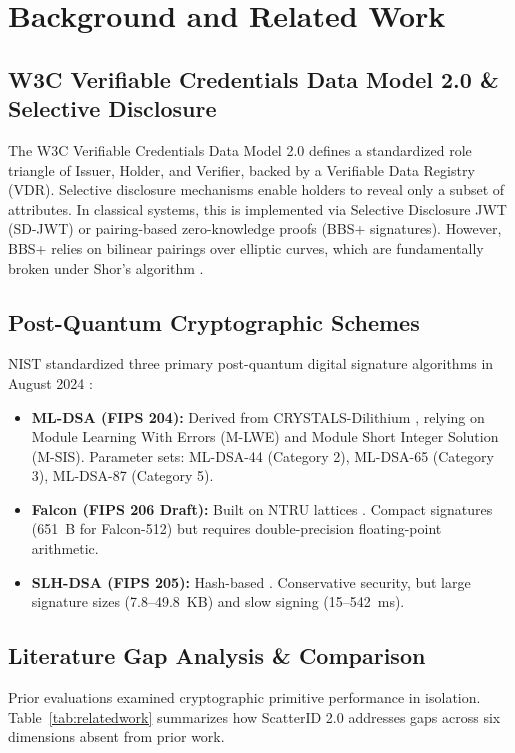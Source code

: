 \documentclass[5p,times,authoryear]{elsarticle}
\begin{document}
\section{Background and Related Work}
\subsection{W3C Verifiable Credentials Data Model 2.0 \& Selective Disclosure}
The W3C Verifiable Credentials Data Model 2.0 \cite{w3cvc2024} defines a standardized role triangle of Issuer, Holder, and Verifier, backed by a Verifiable Data Registry (VDR). Selective disclosure mechanisms enable holders to reveal only a subset of attributes. In classical systems, this is implemented via Selective Disclosure JWT (SD-JWT) \cite{ietfsdjwt2024} or pairing-based zero-knowledge proofs (BBS+ signatures). However, BBS+ relies on bilinear pairings over elliptic curves, which are fundamentally broken under Shor's algorithm \cite{shor1997polynomial}.

\subsection{Post-Quantum Cryptographic Schemes}
NIST standardized three primary post-quantum digital signature algorithms in August 2024 \cite{fips204, fips203, fips205}:
\begin{itemize}[leftmargin=*]
\item \textbf{ML-DSA (FIPS 204):} Derived from CRYSTALS-Dilithium \cite{ducas2018crystals}, relying on Module Learning With Errors (M-LWE) and Module Short Integer Solution (M-SIS). Parameter sets: ML-DSA-44 (Category 2), ML-DSA-65 (Category 3), ML-DSA-87 (Category 5).
\item \textbf{Falcon (FIPS 206 Draft):} Built on NTRU lattices \cite{fouque2020falcon}. Compact signatures (651~B for Falcon-512) but requires double-precision floating-point arithmetic.
\item \textbf{SLH-DSA (FIPS 205):} Hash-based \cite{bernstein2019sphincs}. Conservative security, but large signature sizes (7.8--49.8~KB) and slow signing (15--542~ms).
\end{itemize}

\subsection{Literature Gap Analysis \& Comparison}
\label{sec:litgap}
Prior evaluations \cite{arakawa2025post, opilka2024performance, sikeridis2020post, wood2024towards, dutto2022toward} examined cryptographic primitive performance in isolation. Table~\ref{tab:relatedwork} summarizes how ScatterID 2.0 addresses gaps across six dimensions absent from prior work.
\end{document}
